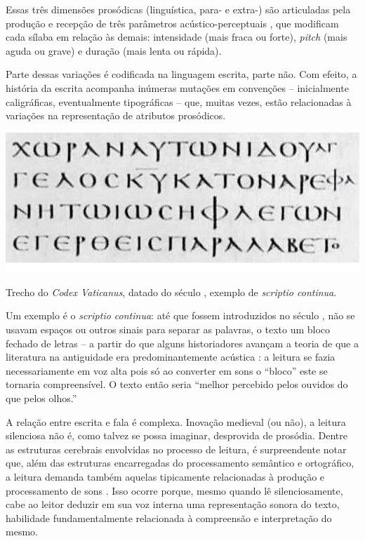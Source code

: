 \documentclass[a4paper]{tufte-handout}
\newcommand{\textls}[2][5]{%
    \begingroup\addfontfeatures{LetterSpace=#1}#2\endgroup
  }
\renewcommand{\smallcapsspacing}[1]{\textls[10]{#1}}
\renewcommand{\textsc}[1]{\smallcapsspacing{\textsmallcaps{#1}}}
\begin{document}
Essas três dimensões prosódicas (linguística, para- e extra-) são articuladas pela produção e recepção de três parâmetros acústico-perceptuais , que modificam cada sílaba em relação às demais: intensidade (mais fraca ou forte), \textit{pitch} (mais aguda ou grave) e duração (mais lenta ou rápida).

Parte dessas variações é codificada na linguagem escrita, parte não. Com efeito, a história da escrita acompanha inúmeras mutações em convenções -- inicialmente caligráficas, eventualmente tipográficas -- que, muitas vezes, estão relacionadas à variações na representação de atributos prosódicos. 

\begin{marginfigure}
  \includegraphics{imgs/codex.png}
  \caption{Trecho do \textit{Codex Vaticanus}, datado do século \textsc{iv}, exemplo de \textit{scriptio continua}. \citep{codex_vaticanus}}
  \label{cdx_vat}
\end{marginfigure}

Um exemplo é o \textit{scriptio continua}: até que fossem introduzidos no século \textsc{vii}, não se usavam espaços ou outros sinais para separar as palavras, o texto um bloco fechado de letras -- a partir do que alguns historiadores avançam a teoria de que a literatura na antiguidade era predominantemente acústica \citep{kuster2016}: a leitura se fazia necessariamente em voz alta pois só ao converter em sons o ``bloco'' este se tornaria compreensível. O texto então seria ``melhor percebido pelos ouvidos do que pelos olhos.'' \citep{nunlist1991}

A relação entre escrita e fala é complexa. Inovação medieval (ou não), a leitura silenciosa não é, como talvez se possa imaginar, desprovida de prosódia. Dentre as estruturas cerebrais envolvidas no processo de leitura, é surpreendente notar que, além das estruturas encarregadas do processamento semântico e ortográfico, a leitura demanda também aquelas tipicamente relacionadas à produção e processamento de sons \citep[cap.~7]{seidenberg2017}. Isso ocorre porque, mesmo quando lê silenciosamente, cabe ao leitor deduzir em sua voz interna uma representação sonora do texto, habilidade fundamentalmente relacionada à compreensão e interpretação do mesmo.
\end{document}
